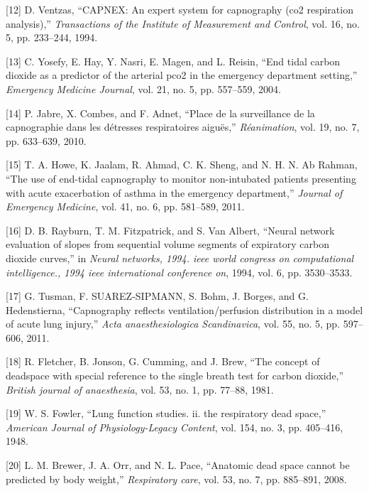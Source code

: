 \documentclass[12pt,]{article}
\begin{document}
\hypertarget{ref-ventzas1994capnex}{}
{[}12{]} D. Ventzas, ``CAPNEX: An expert system for capnography (co2
respiration analysis),'' \emph{Transactions of the Institute of
Measurement and Control}, vol. 16, no. 5, pp. 233--244, 1994.

\hypertarget{ref-yosefy2004end}{}
{[}13{]} C. Yosefy, E. Hay, Y. Nasri, E. Magen, and L. Reisin, ``End
tidal carbon dioxide as a predictor of the arterial pco2 in the
emergency department setting,'' \emph{Emergency Medicine Journal}, vol.
21, no. 5, pp. 557--559, 2004.

\hypertarget{ref-jabre2010place}{}
{[}14{]} P. Jabre, X. Combes, and F. Adnet, ``Place de la surveillance
de la capnographie dans les détresses respiratoires aiguës,''
\emph{Réanimation}, vol. 19, no. 7, pp. 633--639, 2010.

\hypertarget{ref-howe2011use}{}
{[}15{]} T. A. Howe, K. Jaalam, R. Ahmad, C. K. Sheng, and N. H. N. Ab
Rahman, ``The use of end-tidal capnography to monitor non-intubated
patients presenting with acute exacerbation of asthma in the emergency
department,'' \emph{Journal of Emergency Medicine}, vol. 41, no. 6, pp.
581--589, 2011.

\hypertarget{ref-rayburn1994neural}{}
{[}16{]} D. B. Rayburn, T. M. Fitzpatrick, and S. Van Albert, ``Neural
network evaluation of slopes from sequential volume segments of
expiratory carbon dioxide curves,'' in \emph{Neural networks, 1994. ieee
world congress on computational intelligence., 1994 ieee international
conference on}, 1994, vol. 6, pp. 3530--3533.

\hypertarget{ref-tusman2011capnography}{}
{[}17{]} G. Tusman, F. SUAREZ-SIPMANN, S. Bohm, J. Borges, and G.
Hedenstierna, ``Capnography reflects ventilation/perfusion distribution
in a model of acute lung injury,'' \emph{Acta anaesthesiologica
Scandinavica}, vol. 55, no. 5, pp. 597--606, 2011.

\hypertarget{ref-fletcher1981concept}{}
{[}18{]} R. Fletcher, B. Jonson, G. Cumming, and J. Brew, ``The concept
of deadspace with special reference to the single breath test for carbon
dioxide,'' \emph{British journal of anaesthesia}, vol. 53, no. 1, pp.
77--88, 1981.

\hypertarget{ref-fowler1948lung}{}
{[}19{]} W. S. Fowler, ``Lung function studies. ii. the respiratory dead
space,'' \emph{American Journal of Physiology-Legacy Content}, vol. 154,
no. 3, pp. 405--416, 1948.

\hypertarget{ref-brewer2008anatomic}{}
{[}20{]} L. M. Brewer, J. A. Orr, and N. L. Pace, ``Anatomic dead space
cannot be predicted by body weight,'' \emph{Respiratory care}, vol. 53,
no. 7, pp. 885--891, 2008.
\end{document}

